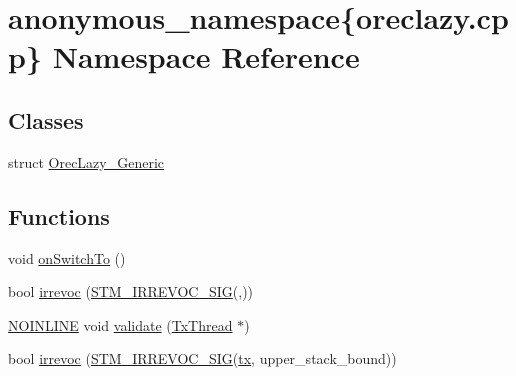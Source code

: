 \hypertarget{namespaceanonymous__namespace_02oreclazy_8cpp_03}{\section{anonymous\-\_\-namespace\{oreclazy.\-cpp\} Namespace Reference}
\label{namespaceanonymous__namespace_02oreclazy_8cpp_03}
}
\subsection*{Classes}
\begin{DoxyCompactItemize}
\item 
struct \hyperlink{structanonymous__namespace_02oreclazy_8cpp_03_1_1OrecLazy__Generic}{Orec\-Lazy\-\_\-\-Generic}
\end{DoxyCompactItemize}
\subsection*{Functions}
\begin{DoxyCompactItemize}
\item 
void \hyperlink{namespaceanonymous__namespace_02oreclazy_8cpp_03_a228bf9de4c09f23374e35032fba36d36}{on\-Switch\-To} ()
\item 
bool \hyperlink{namespaceanonymous__namespace_02oreclazy_8cpp_03_acf582010356d11b17267b5a63fe72066}{irrevoc} (\hyperlink{include_2stm_2macros_8hpp_acf117c2df6442342f6603e1a12fa3b5c}{S\-T\-M\-\_\-\-I\-R\-R\-E\-V\-O\-C\-\_\-\-S\-I\-G}(,))
\item 
\hyperlink{platform_8hpp_a1b173d22e57d9395897acbd8de62d505}{N\-O\-I\-N\-L\-I\-N\-E} void \hyperlink{namespaceanonymous__namespace_02oreclazy_8cpp_03_a8434dca53f6bf86e1ac69c7d3c135251}{validate} (\hyperlink{structstm_1_1TxThread}{Tx\-Thread} $\ast$)
\item 
bool \hyperlink{namespaceanonymous__namespace_02oreclazy_8cpp_03_a91428098388d7e210055baacee0f0481}{irrevoc} (\hyperlink{include_2stm_2macros_8hpp_acf117c2df6442342f6603e1a12fa3b5c}{S\-T\-M\-\_\-\-I\-R\-R\-E\-V\-O\-C\-\_\-\-S\-I\-G}(\hyperlink{stmskip_8cc_a0f1c58699b83ce5a08bd9ee859250d72}{tx}, upper\-\_\-stack\-\_\-bound))
\end{DoxyCompactItemize}



